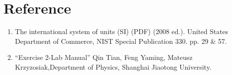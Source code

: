 \section{Reference}
\begin{enumerate}
\item  The international system of units (SI) (PDF) (2008 ed.). United States Department of Commerce, NIST Special Publication 330. pp. 29 \& 57.
\item “Exercise 2-Lab Manual” Qin Tian, Feng Yaming, Mateusz Krzyzosiak,Department of Physics, Shanghai Jiaotong University.  
\end{enumerate}
